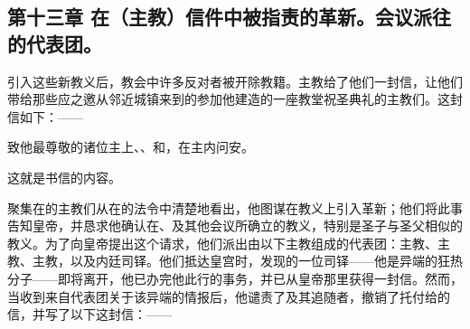 
\subsection{第十三章 在（主教）信件中被指责的革新。会议派往的代表团。}

引入这些新教义后，教会中许多反对者被开除教籍。主教给了他们一封信，让他们带给那些应之邀从邻近城镇来到的参加他建造的一座教堂祝圣典礼的主教们。这封信如下：——\par

致他最尊敬的诸位主上、、和，在主内问安。\par

这就是书信的内容。\par

聚集在的主教们从在的法令中清楚地看出，他图谋在教义上引入革新；他们将此事告知皇帝，并恳求他确认在、及其他会议所确立的教义，特别是圣子与圣父相似的教义。为了向皇帝提出这个请求，他们派出由以下主教组成的代表团：主教、主教、主教，以及内廷司铎。他们抵达皇宫时，发现的一位司铎——他是异端的狂热分子——即将离开，他已办完他此行的事务，并已从皇帝那里获得一封信。然而，当收到来自代表团关于该异端的情报后，他谴责了及其追随者，撤销了托付给的信，并写了以下这封信：——\par



